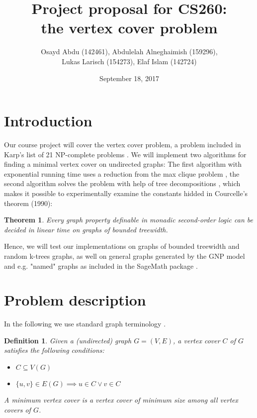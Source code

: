 \documentclass[11pt,a4paper]{article}
\title{Project proposal for CS260: \\ \normalsize the vertex cover problem}
\author{Osayd Abdu (142461), Abdulelah Alneghaimish (159296), \\ Lukas Larisch (154273), Elaf Islam (142724)}
\date{September 18, 2017}
\newtheorem*{definition}{Definition}
\newtheorem*{theorem}{Theorem}
\begin{document}
\maketitle

\section{Introduction}

Our course project will cover the vertex cover problem, a problem included in Karp's list of 21 NP-complete  problems \cite{karp, wiki}. We will implement two algorithms for finding a minimal vertex cover on undirected graphs: The first algorithm with exponential running time uses a reduction from the max clique problem \cite{Patric}, the second algorithm solves the problem with help of tree decompositions \cite{survey, graphminor, arnborg}, which makes it possible to experimentally examine the constants hidded in Courcelle's theorem (1990):

\begin{theorem}
Every graph property definable in monadic second-order logic can be decided in linear time on graphs of bounded treewidth.
\end{theorem}

Hence, we will test our implementations on graphs of bounded treewidth and random k-trees graphs, as well on general graphs generated by the GNP model and  e.g. "named" graphs as included in the SageMath package \cite{sage}.

\section{Problem description}

In the following we use standard graph terminology \cite{Diestel}.

\begin{definition}

Given a (undirected) graph $G = (V, E)$, a \emph{vertex cover} $C$ of $G$ satisfies the following conditions:

\begin{itemize}
\item $C \subseteq V(G)$ 
\item $\{u, v\} \in E(G) \implies u \in C \lor v \in C$ 
\end{itemize}

A \emph{minimum vertex cover} is a vertex cover of minimum size among all vertex covers of $G$.

\end{definition}
\end{document}
